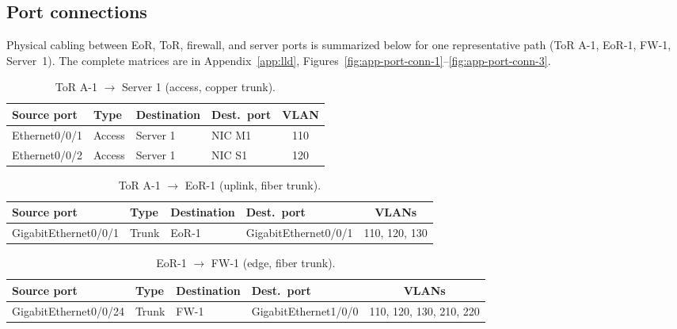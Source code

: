\subsection{Port connections}
Physical cabling between EoR, ToR, firewall, and server ports is summarized below for one representative path (ToR A-1, EoR-1, FW-1, Server~1). The complete matrices are in Appendix~\ref{app:lld}, Figures~\ref{fig:app-port-conn-1}--\ref{fig:app-port-conn-3}.

\begin{table}[H]
    \centering
    \footnotesize
    \caption{ToR A-1 $\rightarrow$ Server 1 (access, copper trunk).}
    \label{tab:lld-port-tor-server}
    \begin{tabular}{|l|l|l|l|c|}
        \hline
        \textbf{Source port} & \textbf{Type} & \textbf{Destination} & \textbf{Dest.\ port} & \textbf{VLAN} \\
        \hline
        Ethernet0/0/1 & Access & Server 1 & NIC M1 & 110 \\
        Ethernet0/0/2 & Access & Server 1 & NIC S1 & 120 \\
        \hline
    \end{tabular}
\end{table}

\begin{table}[H]
    \centering
    \footnotesize
    \caption{ToR A-1 $\rightarrow$ EoR-1 (uplink, fiber trunk).}
    \label{tab:lld-port-tor-eor}
    \begin{tabular}{|l|l|l|l|c|}
        \hline
        \textbf{Source port} & \textbf{Type} & \textbf{Destination} & \textbf{Dest.\ port} & \textbf{VLANs} \\
        \hline
        GigabitEthernet0/0/1 & Trunk & EoR-1 & GigabitEthernet0/0/1 & 110, 120, 130 \\
        \hline
    \end{tabular}
\end{table}

\begin{table}[H]
    \centering
    \footnotesize
    \caption{EoR-1 $\rightarrow$ FW-1 (edge, fiber trunk).}
    \label{tab:lld-port-eor-fw}
    \begin{tabular}{|l|l|l|l|c|}
        \hline
        \textbf{Source port} & \textbf{Type} & \textbf{Destination} & \textbf{Dest.\ port} & \textbf{VLANs} \\
        \hline
        GigabitEthernet0/0/24 & Trunk & FW-1 & GigabitEthernet1/0/0 & 110, 120, 130, 210, 220 \\
        \hline
    \end{tabular}
\end{table}


